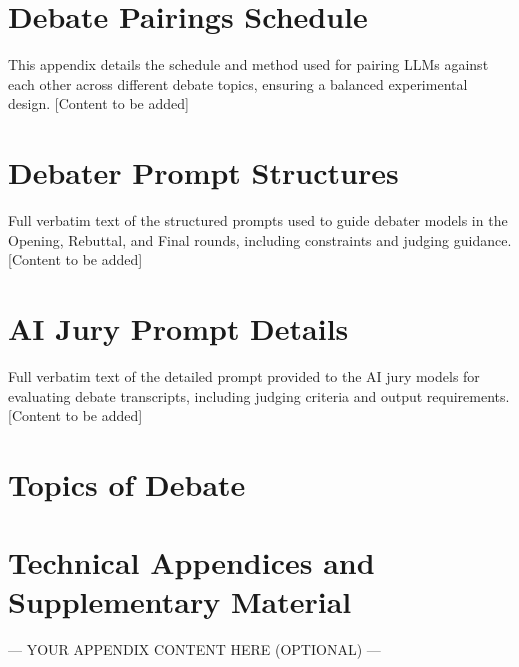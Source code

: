 \documentclass{article}
\begin{document}
\section{Debate Pairings Schedule}
\label{appendix:pairings}
This appendix details the schedule and method used for pairing LLMs against each other across different debate topics, ensuring a balanced experimental design. [Content to be added]

\section{Debater Prompt Structures}
\label{appendix:debater_prompts}
Full verbatim text of the structured prompts used to guide debater models in the Opening, Rebuttal, and Final rounds, including constraints and judging guidance. [Content to be added]

\section{AI Jury Prompt Details}
\label{appendix:judge_prompt}
Full verbatim text of the detailed prompt provided to the AI jury models for evaluating debate transcripts, including judging criteria and output requirements. [Content to be added]

\section{Topics of Debate}
\label{appendix:topics}

\section{Technical Appendices and Supplementary Material}

--- YOUR APPENDIX CONTENT HERE (OPTIONAL) ---


\end{document}
